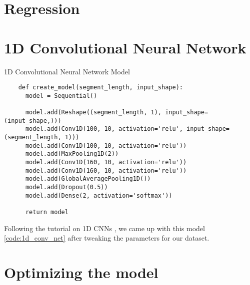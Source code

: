 \section{Regression}

\section{1D Convolutional Neural Network}

\begin{code}
  \caption{1D Convolutional Neural Network Model}
  \label{code:1d_conv_net}
  
  \begin{verbatim}
    def create_model(segment_length, input_shape):
      model = Sequential()

      model.add(Reshape((segment_length, 1), input_shape=(input_shape,)))
      model.add(Conv1D(100, 10, activation='relu', input_shape=(segment_length, 1)))
      model.add(Conv1D(100, 10, activation='relu'))
      model.add(MaxPooling1D(2))
      model.add(Conv1D(160, 10, activation='relu'))
      model.add(Conv1D(160, 10, activation='relu'))
      model.add(GlobalAveragePooling1D())
      model.add(Dropout(0.5))
      model.add(Dense(2, activation='softmax'))

      return model
  \end{verbatim}
\end{code}

Following the tutorial on 1D CNNs \cite{1d_cnn}, we came up with this model \ref{code:1d_conv_net} after tweaking the parameters for our dataset.
 

\section{Optimizing the model}